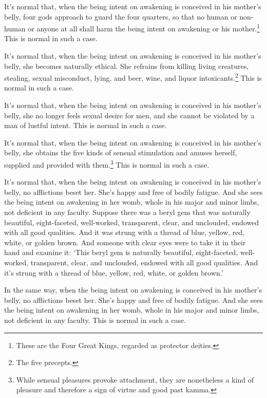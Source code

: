 \documentclass[12pt,openany]{book}%
\begin{document}
It’s normal that, when the being intent on awakening is conceived in his mother’s belly, four gods approach to guard the four quarters, so that no human or non-human or anyone at all shall harm the being intent on awakening or his mother.\footnote{These are the Four Great Kings, regarded as protector deities. } This is normal in such a case. 

It’s normal that, when the being intent on awakening is conceived in his mother’s belly, she becomes naturally ethical. She refrains from killing living creatures, stealing, sexual misconduct, lying, and beer, wine, and liquor intoxicants.\footnote{The five precepts. } This is normal in such a case. 

It’s normal that, when the being intent on awakening is conceived in his mother’s belly, she no longer feels sexual desire for men, and she cannot be violated by a man of lustful intent. This is normal in such a case. 

It’s normal that, when the being intent on awakening is conceived in his mother’s belly, she obtains the five kinds of sensual stimulation and amuses herself, supplied and provided with them.\footnote{While sensual pleasures provoke attachment, they are nonetheless a kind of pleasure and therefore a sign of virtue and good past kamma. } This is normal in such a case. 

It’s normal that, when the being intent on awakening is conceived in his mother’s belly, no afflictions beset her. She’s happy and free of bodily fatigue. And she sees the being intent on awakening in her womb, whole in his major and minor limbs, not deficient in any faculty. Suppose there was a beryl gem that was naturally beautiful, eight-faceted, well-worked, transparent, clear, and unclouded, endowed with all good qualities. And it was strung with a thread of blue, yellow, red, white, or golden brown. And someone with clear eyes were to take it in their hand and examine it: ‘This beryl gem is naturally beautiful, eight-faceted, well-worked, transparent, clear, and unclouded, endowed with all good qualities. And it’s strung with a thread of blue, yellow, red, white, or golden brown.’ 

In the same way, when the being intent on awakening is conceived in his mother’s belly, no afflictions beset her. She’s happy and free of bodily fatigue. And she sees the being intent on awakening in her womb, whole in his major and minor limbs, not deficient in any faculty. This is normal in such a case. 
\end{document}
